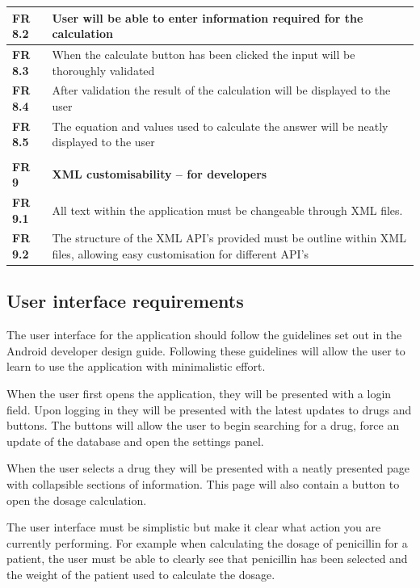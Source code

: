 \documentclass[11pt,fleqn,twoside]{article}
\begin{document}
\begin{center}
\begin{longtable}{| l | p{14.3cm} |}
\textbf{FR 8.2} & User will be able to enter information required for the calculation    \\ \hline
\textbf{FR 8.3} & When the calculate button has been clicked the input will be thoroughly validated\\ \hline
\textbf{FR 8.4} & After validation the result of the calculation will be displayed to the user\\ \hline
\textbf{FR 8.5} & The equation and values used to calculate the answer will be neatly displayed to the user  \\ \hline
\textbf{}  &  \\ \hline
\textbf{FR 9}   & \textbf{XML customisability – for developers} \\ \hline
\textbf{FR 9.1} & All text within the application must be changeable through XML files.  \\ \hline
\textbf{FR 9.2} & The structure of the XML API’s provided must be outline within XML files, allowing easy customisation for different API’s   \\ \hline
\end{longtable}
\end{center}


\subsection{User interface requirements}
The user interface for the application should follow the guidelines set out in the Android developer design guide. Following these guidelines will allow the user to learn to use the application with minimalistic effort.

When the user first opens the application, they will be presented with a login field. Upon logging in they will be presented with the latest updates to drugs and buttons. The buttons will allow the user to begin searching for a drug, force an update of the database and open the settings panel.

When the user selects a drug they will be presented with a neatly presented page with collapsible sections of information. This page will also contain a button to open the dosage calculation.

The user interface must be simplistic but make it clear what action you are currently performing. For example when calculating the dosage of penicillin for a patient, the user must be able to clearly see that penicillin has been selected and the weight of the patient used to calculate the dosage.
\end{document}
